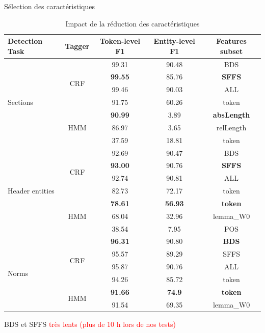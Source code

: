\documentclass[newPxFont,pagenumber]{beamer}
\begin{document}
\begin{frame}{Sélection des caractéristiques}
\begin{table}[!h]
\tiny
\begin{tabular}{l|c|ccc}
\hline\noalign{\smallskip}
Detection Task & Tagger & {Token-level F1} & {Entity-level F1}& Features subset \\ \hline
\multirow{7}{*}{Sections} 		& \multirow{4}{*}{CRF} & 99.31 & 90.48 & BDS  \\
  				&  & \textbf{99.55} & 85.76 & \textbf{SFFS} \\
                &  & 99.46 & 90.03 & ALL \\
                &  & 91.75 & 60.26 & token \\  \cline{2-5}
                 & \multirow{3}{*}{HMM} & \textbf{90.99} & 3.89 & \textbf{absLength} \\ 
 & & 86.97 & 3.65 & relLength \\   
  &  & 37.59 & 18.81 & token \\ \hline
\multirow{7}{*}{Header entities}	& \multirow{4}{*}{CRF} & 92.69 & 90.47 & BDS  \\
				&  & \textbf{93.00} & 90.76 & \textbf{SFFS}  \\ 
                &  & 92.74 & 90.81 & ALL \\
                &  & 82.73 & 72.17 & token \\ \cline{2-5}
                  &  \multirow{3}{*}{HMM}  & \textbf{78.61} & \textbf{56.93} &  \textbf{token} \\ 
  &    & 68.04 & 32.96 &  lemma\_W0 \\ 
  &    & 38.54 & 7.95 &  POS \\ \hline
\multirow{6}{*}{Norms} 			& \multirow{4}{*}{CRF} & \textbf{96.31} & 90.80 & \textbf{BDS} \\ 
				&  & 95.57 & 89.29 & SFFS \\ 
                &  & 95.87 & 90.76 & ALL \\
                &  & 94.26 & 85.72 & token \\ \cline{2-5}
                 &  \multirow{2}{*}{HMM} & \textbf{91.66} & \textbf{74.9} &  \textbf{token} \\ 
  &   & 91.54 & 69.35 &  lemma\_W0 \\ 
\end{tabular}
\caption{Impact de la réduction des caractéristiques}
\end{table}



BDS et SFFS \textcolor{red}{très lents (plus de 10 h lors de nos tests)}
\end{frame}
\end{document}
